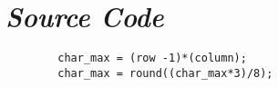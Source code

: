 \appendix 
\chapter{\emph{Source Code}}
	\begin{verbatim}
		char_max = (row -1)*(column);
		char_max = round((char_max*3)/8);
		
	\end{verbatim}
